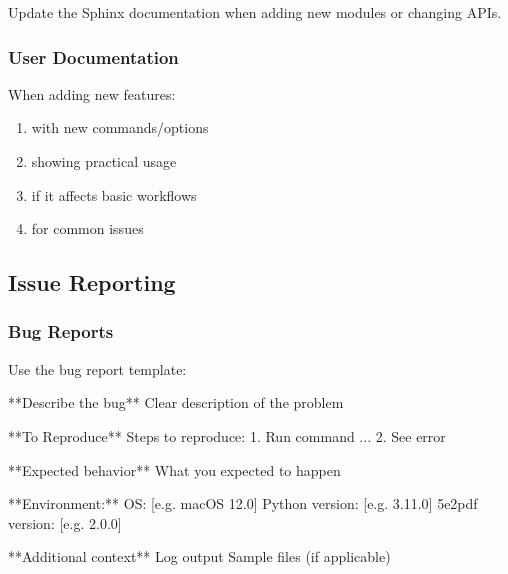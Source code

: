\documentclass[letterpaper,10pt,english]{sphinxmanual}
\begin{document}
\sphinxAtStartPar
Update the Sphinx documentation when adding new modules or changing APIs.


\subsubsection{User Documentation}
\label{\detokenize{developer/contributing:user-documentation}}
\sphinxAtStartPar
When adding new features:
\begin{enumerate}
%
\item {} 
\sphinxAtStartPar
{} with new commands/options

\item {} 
\sphinxAtStartPar
{} showing practical usage

\item {} 
\sphinxAtStartPar
{} if it affects basic workflows

\item {} 
\sphinxAtStartPar
{} for common issues

\end{enumerate}


\subsection{Issue Reporting}
\label{\detokenize{developer/contributing:issue-reporting}}

\subsubsection{Bug Reports}
\label{\detokenize{developer/contributing:bug-reports}}
\sphinxAtStartPar
Use the bug report template:

\begin{sphinxVerbatim}[commandchars=\\\{\}]
**Describe the bug**
Clear description of the problem

**To Reproduce**
Steps to reproduce:
1. Run command \PYGZsq{}...\PYGZsq{}
2. See error

**Expected behavior**
What you expected to happen

**Environment:**
\PYGZhy{} OS: [e.g. macOS 12.0]
\PYGZhy{} Python version: [e.g. 3.11.0]
\PYGZhy{} 5e2pdf version: [e.g. 2.0.0]

**Additional context**
\PYGZhy{} Log output
\PYGZhy{} Sample files (if applicable)
\end{sphinxVerbatim}
\end{document}
